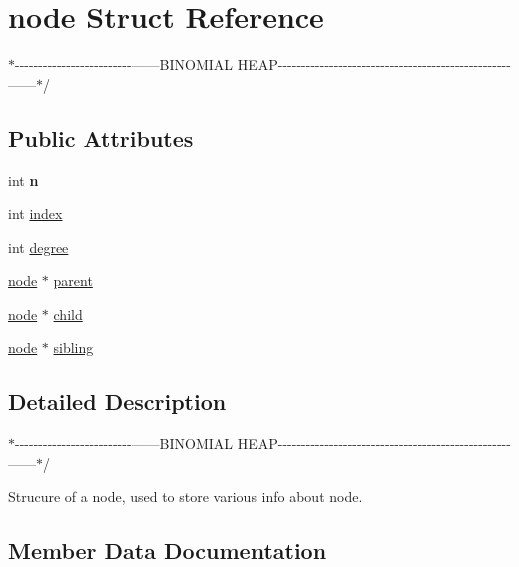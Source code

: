 \hypertarget{structnode}{}\section{node Struct Reference}
\label{structnode}


$\ast$-\/-\/-\/-\/-\/-\/-\/-\/-\/-\/-\/-\/-\/-\/-\/-\/-\/-\/-\/-\/-\/-\/-\/-\/-\/------B\+I\+N\+O\+M\+I\+AL H\+E\+A\+P-\/-\/-\/-\/-\/-\/-\/-\/-\/-\/-\/-\/-\/-\/-\/-\/-\/-\/-\/-\/-\/-\/-\/-\/-\/-\/-\/-\/-\/-\/-\/-\/-\/-\/-\/-\/-\/-\/-\/-\/-\/-\/-\/-\/-\/-\/-\/-\/-\/-\/------$\ast$/  


\subsection*{Public Attributes}
\begin{DoxyCompactItemize}
\item 
int {\bfseries n}\hypertarget{structnode_a027ad0e5186d6cfab02c74a3da2d28a9}{}\label{structnode_a027ad0e5186d6cfab02c74a3da2d28a9}

\item 
int \hyperlink{structnode_a5359a7ce1309be9415907be3ebbd2f91}{index}
\item 
int \hyperlink{structnode_a5ef19e24e48768739e8743eccbc81434}{degree}
\item 
\hyperlink{structnode}{node} $\ast$ \hyperlink{structnode_a5e88137f1d0e2f7a940bccf4c3d3a4d3}{parent}
\item 
\hyperlink{structnode}{node} $\ast$ \hyperlink{structnode_a422bd5292acd3b746c3f3113f76de9a7}{child}
\item 
\hyperlink{structnode}{node} $\ast$ \hyperlink{structnode_a0941f5cd2e8bd7fda70619bb099f267d}{sibling}
\end{DoxyCompactItemize}


\subsection{Detailed Description}
$\ast$-\/-\/-\/-\/-\/-\/-\/-\/-\/-\/-\/-\/-\/-\/-\/-\/-\/-\/-\/-\/-\/-\/-\/-\/-\/------B\+I\+N\+O\+M\+I\+AL H\+E\+A\+P-\/-\/-\/-\/-\/-\/-\/-\/-\/-\/-\/-\/-\/-\/-\/-\/-\/-\/-\/-\/-\/-\/-\/-\/-\/-\/-\/-\/-\/-\/-\/-\/-\/-\/-\/-\/-\/-\/-\/-\/-\/-\/-\/-\/-\/-\/-\/-\/-\/-\/------$\ast$/ 

Strucure of a node, used to store various info about node. 

\subsection{Member Data Documentation}
